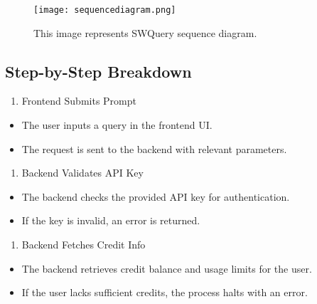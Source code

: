 \documentclass[
]{article}
\providecommand{\tightlist}{%
  \setlength{\itemsep}{0pt}\setlength{\parskip}{0pt}}
\begin{document}
\begin{figure}[H]
\centering
\texttt{[image: sequencediagram.png]}
\caption{\label{fig:sequencediagram}This image represents SWQuery sequence diagram.}
\end{figure}

\hypertarget{step-by-step-breakdown}{%
\subsection{Step-by-Step Breakdown}\label{step-by-step-breakdown}}

\begin{enumerate}
\def\labelenumi{\arabic{enumi}.}
\tightlist
\item
  Frontend Submits Prompt
\end{enumerate}

\begin{itemize}
\tightlist
\item
  The user inputs a query in the frontend UI.
\item
  The request is sent to the backend with relevant parameters.
\end{itemize}

\begin{enumerate}
\def\labelenumi{\arabic{enumi}.}
\setcounter{enumi}{1}
\tightlist
\item
  Backend Validates API Key
\end{enumerate}

\begin{itemize}
\tightlist
\item
  The backend checks the provided API key for authentication.
\item
  If the key is invalid, an error is returned.
\end{itemize}

\begin{enumerate}
\def\labelenumi{\arabic{enumi}.}
\setcounter{enumi}{2}
\tightlist
\item
  Backend Fetches Credit Info
\end{enumerate}

\begin{itemize}
\tightlist
\item
  The backend retrieves credit balance and usage limits for the user.
\item
  If the user lacks sufficient credits, the process halts with an error.
\end{itemize}
\end{document}
